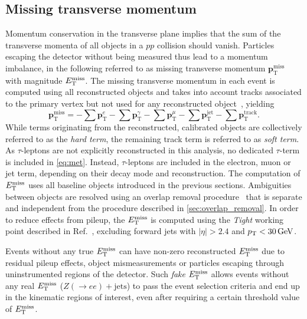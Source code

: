 \subsection{Missing transverse momentum}

Momentum conservation in the transverse plane implies that the sum of the transverse momenta of all objects in a $pp$ collision should vanish.
Particles escaping the detector without being measured thus lead to a momentum imbalance, in the following referred to as missing transverse momentum $\boldsymbol{p}^{\textrm{miss}}_\textrm{T}$ with magnitude $E_{\textrm{T}}^{\textrm{miss}}$.
The missing transverse momentum in each event is computed using all reconstructed objects and takes into account tracks associated to the primary vertex but not used for any reconstructed object~\cite{PERF-2016-07}, yielding
\begin{equation}
	\boldsymbol{p}^{\textrm{miss}}_\textrm{T} = - \sum\boldsymbol{p}^{e}_{\textrm{T}} - \sum\boldsymbol{p}^{\gamma}_{\textrm{T}} - \sum\boldsymbol{p}^{\mu}_{\textrm{T}} - \sum\boldsymbol{p}^{\mathrm{jet}}_{\textrm{T}} - \sum\boldsymbol{p}^{\mathrm{track}}_{\textrm{T}}.
	\label{eq:met}
\end{equation}
While terms originating from the reconstructed, calibrated objects are collectively referred to as the \textit{hard term}, the remaining track term is referred to as \textit{soft term}.
As $\tau$-leptons are not explicitly reconstructed in this analysis, no dedicated $\tau$-term is included in \cref{eq:met}. Instead, $\tau$-leptons are included in the electron, muon or jet term, depending on their decay mode and reconstruction. The computation of $E_{\textrm{T}}^{\textrm{miss}}$ uses all baseline objects introduced in the previous sections. Ambiguities between objects are resolved using an overlap removal procedure~\cite{PERF-2016-07} that is separate and independent from the procedure described in \cref{sec:overlap_removal}. In order to reduce effects from pileup, the $E_{\textrm{T}}^{\textrm{miss}}$ is computed using the \textit{Tight} working point described in Ref.~\cite{ATLAS-CONF-2018-023}, excluding forward jets with $\vert\eta\vert > 2.4$ and $\pt < \SI{30}{\GeV}$.

Events without any true $E_{\textrm{T}}^{\textrm{miss}}$ can have non-zero reconstructed $E_{\textrm{T}}^{\textrm{miss}}$ due to residual pileup effects, object mismeasurements or particles escaping through uninstrumented regions of the detector. Such \textit{fake} $E_{\textrm{T}}^{\textrm{miss}}$ allows events without any real $E_{\textrm{T}}^{\textrm{miss}}$ (\eg $Z(\rightarrow ee)+\mathrm{jets}$) to pass the event selection criteria and end up in the kinematic regions of interest, even after requiring a certain threshold value of $E_{\textrm{T}}^{\textrm{miss}}$.


